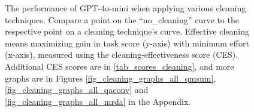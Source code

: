 \begin{figure}[h!]
    \centering
    \hspace{0.2cm}
    \hspace{0.2cm}
    \caption{The performance of GPT-4o-mini when applying various cleaning techniques. Compare a point on the ``no\_cleaning'' curve to the respective point on a cleaning technique's curve. Effective cleaning means maximizing gain in task score (y-axis) with minimum effort (x-axis), measured using the cleaning-effectiveness score (CES).
    Additional CES scores are in \autoref{tab_scores_cleaning}, and more graphs are in Figures \ref{fig_cleaning_graphs_all_qmsum}, \ref{fig_cleaning_graphs_all_qaconv} and \ref{fig_cleaning_graphs_all_mrda} in the Appendix.}
    \label{fig_cleaning_graphs}
\end{figure}